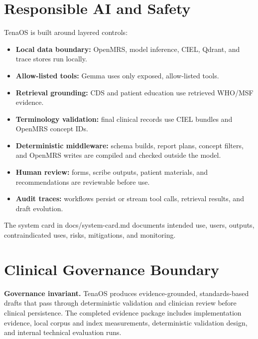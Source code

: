 \documentclass[11pt]{article}
\newcommand{\Product}{TenaOS}
\newcommand{\OpenMRS}{OpenMRS}
\newcommand{\CIEL}{CIEL}
\newcommand{\WHO}{WHO/MSF}
\newcommand{\code}[1]{{\setlength{\fboxsep}{1.7pt}\colorbox{codebg}{\textcolor{codeink}{\small\ttfamily #1}}}}
\begin{document}
\section{Responsible AI and Safety}

\Product{} is built around layered controls:

\begin{itemize}
  \item \textbf{Local data boundary:} \OpenMRS{}, model inference, \CIEL{}, Qdrant, and trace stores run locally.
  \item \textbf{Allow-listed tools:} Gemma uses only exposed, allow-listed tools.
  \item \textbf{Retrieval grounding:} CDS and patient education use retrieved \WHO{} evidence.
  \item \textbf{Terminology validation:} final clinical records use \CIEL{} bundles and \OpenMRS{} concept IDs.
  \item \textbf{Deterministic middleware:} schema builds, report plans, concept filters, and \OpenMRS{} writes are compiled and checked outside the model.
  \item \textbf{Human review:} forms, scribe outputs, patient materials, and recommendations are reviewable before use.
  \item \textbf{Audit traces:} workflows persist or stream tool calls, retrieval results, and draft evolution.
\end{itemize}

The system card in \code{docs/system-card.md} documents intended use, users, outputs, contraindicated uses, risks, mitigations, and monitoring.

\section{Clinical Governance Boundary}

\begin{safetybox}
\textbf{Governance invariant.} \Product{} produces evidence-grounded, standards-based drafts that pass through deterministic validation and clinician review before clinical persistence. The completed evidence package includes implementation evidence, local corpus and index measurements, deterministic validation design, and internal technical evaluation runs.
\end{safetybox}
\end{document}
